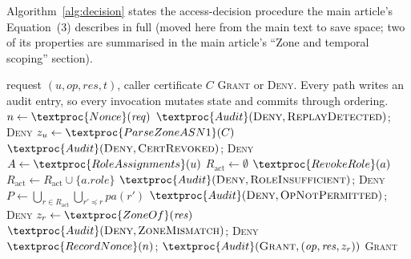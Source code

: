 \begin{widefig}
\caption{Access control within the Fabric execute-order-validate transaction flow.}
\label{fig:flow}
\end{widefig}

Algorithm~\ref{alg:decision} states the access-decision procedure the main
article's Equation~(3) describes in full (moved here from the main text
to save space; two of its properties are summarised in the main article's
``Zone and temporal scoping'' section).

\begin{widealg}
\caption{Access decision (\texttt{CheckAccess})}
\label{alg:decision}
\small
\begin{algorithmic}[1]
\Require request $(u, \mathit{op}, \mathit{res}, t)$, caller certificate $C$
\Ensure \textsc{Grant} or \textsc{Deny}. Every path writes an audit entry,
  so every invocation mutates state and commits through ordering.
\State $n \gets \textproc{Nonce}(\mathit{req})$
  \State $\textproc{Audit}(\textsc{Deny}, \textsc{ReplayDetected})$;\;
         \Return \textsc{Deny}
\EndIf
\State $z_u \gets \textproc{ParseZoneASN1}(C)$
  \State $\textproc{Audit}(\textsc{Deny}, \textsc{CertRevoked})$;\;
         \Return \textsc{Deny}
\EndIf
\State $A \gets \textproc{RoleAssignments}(u)$
\State $R_{\text{act}} \gets \emptyset$
    \State $\textproc{RevokeRole}(a)$
  \Else
    \State $R_{\text{act}} \gets R_{\text{act}} \cup \{a.\mathit{role}\}$
  \EndIf
\EndFor
{}
  \State $\textproc{Audit}(\textsc{Deny}, \textsc{RoleInsufficient})$;\;
         \Return \textsc{Deny}
\EndIf
\State $P \gets \bigcup_{r \in R_{\text{act}}}
        \bigcup_{r' \preceq r} pa(r')$
  \State $\textproc{Audit}(\textsc{Deny}, \textsc{OpNotPermitted})$;\;
         \Return \textsc{Deny}
\EndIf
\State $z_r \gets \textproc{ZoneOf}(\mathit{res})$
  \State $\textproc{Audit}(\textsc{Deny}, \textsc{ZoneMismatch})$;\;
         \Return \textsc{Deny}
\EndIf
\State $\textproc{RecordNonce}(n)$;\;
       $\textproc{Audit}(\textsc{Grant}, (\mathit{op}, \mathit{res}, z_r))$
\State \Return \textsc{Grant}
\end{algorithmic}
\end{widealg}

